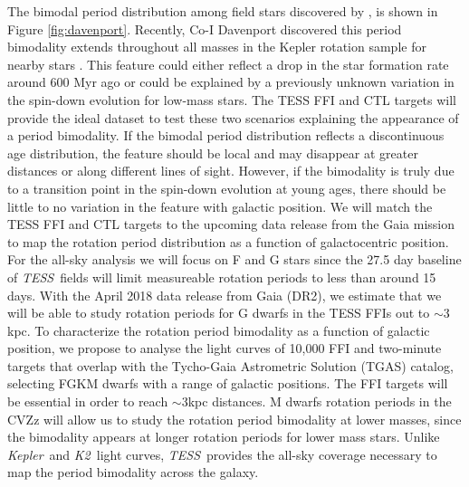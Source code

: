 \documentclass[letterpaper,12pt,preprint]{hack_aastex}
\newcommand{\Kepler}{{\it Kepler}}
\newcommand{\kepler}{\Kepler}
\newcommand{\Ktwo}{{\it K2}}
\newcommand{\ktwo}{\Ktwo}
\newcommand{\TESS}{{\it TESS}}
\begin{document}
The bimodal period distribution among field stars discovered by
\citet{mcquillan2013}, is shown in Figure \ref{fig:davenport}.
Recently, Co-I Davenport discovered this period bimodality extends throughout
all masses in the Kepler rotation sample for nearby stars
\citep{davenport2017}.
This feature could either reflect a drop in the star formation rate around 600
Myr ago or could be explained by a previously unknown variation in the
spin-down evolution for low-mass stars.
The TESS FFI and CTL targets will provide the ideal dataset to test these two
scenarios explaining the appearance of a period bimodality.
If the bimodal period distribution reflects a discontinuous age distribution,
the feature should be local and may disappear at greater distances or along
different lines of sight.
However, if the bimodality is truly due to a transition point in the spin-down
evolution at young ages, there should be little to no variation in the feature
with galactic position.
We will match the TESS FFI and CTL targets to the upcoming data
release from the Gaia mission \citep{perryman2001} to map the rotation period
distribution as a function of galactocentric position.
For the all-sky analysis we will focus on F and G stars since the 27.5 day
baseline of \TESS\ fields will limit measureable rotation periods to less than
around 15 days.
With the April 2018 data release from Gaia (DR2), we estimate that we will be
able to study rotation periods for G dwarfs in the TESS FFIs out to $\sim$3
kpc.
To characterize the rotation period bimodality as a function of galactic
position, we propose to analyse the light curves of 10,000 FFI and two-minute
targets that overlap with the Tycho-Gaia Astrometric Solution (TGAS) catalog,
selecting FGKM dwarfs with a range of galactic positions.
The FFI targets will be essential in order to reach $\sim$3kpc distances.
M dwarfs rotation periods in the CVZz will allow us to study the rotation
period bimodality at lower masses, since the bimodality appears at longer
rotation periods for lower mass stars.
Unlike \kepler\ and \ktwo\ light curves, \TESS\ provides the all-sky coverage
necessary to map the period bimodality across the galaxy.

\end{document}
